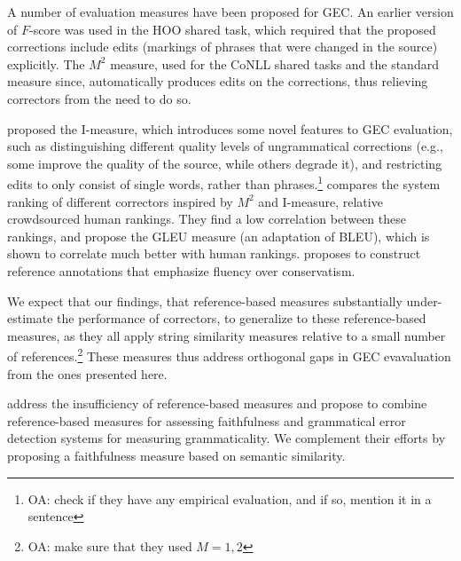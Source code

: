 \documentclass[letter,11pt]{article}
\newcommand{\oa}[1]{\footnote{\color{red}OA: #1}}
\begin{document}
A number of evaluation measures have been proposed for GEC.
An earlier version of $F$-score was used in the HOO shared task, which required that
the proposed corrections include edits (markings of phrases that were changed 
in the source) explicitly. The $M^2$ measure, used for the CoNLL shared tasks and the standard
measure since, automatically produces edits on the corrections, thus relieving correctors from
the need to do so. 

 proposed the {\sc I-measure},
which introduces some novel features to GEC evaluation, such as distinguishing
different quality levels of ungrammatical corrections (e.g., some improve the quality of
the source, while others degrade it), and restricting edits to only consist of single words,
rather than phrases.\oa{check if they have any empirical evaluation, and if so, mention it
  in a sentence}  compares the system ranking of different correctors inspired by $M^2$ and I-measure, relative crowdsourced human rankings. They find a low correlation between these rankings, and propose the GLEU measure (an adaptation of BLEU), which is shown
to correlate much better with human rankings.  proposes
to construct reference annotations that emphasize fluency over conservatism.

We expect that our findings, that reference-based measures substantially under-estimate the
performance of correctors, to generalize to these reference-based measures, as they all
apply string similarity measures relative to a small number of references.\oa{make sure
  that they used $M=1,2$}
These measures thus address orthogonal gaps in GEC evavaluation from the ones presented here.

 address the
insufficiency of reference-based measures and propose to combine
reference-based measures for assessing faithfulness and
grammatical error detection systems for measuring grammaticality.
We complement their efforts by proposing a faithfulness measure based
on semantic similarity.


\end{document}
